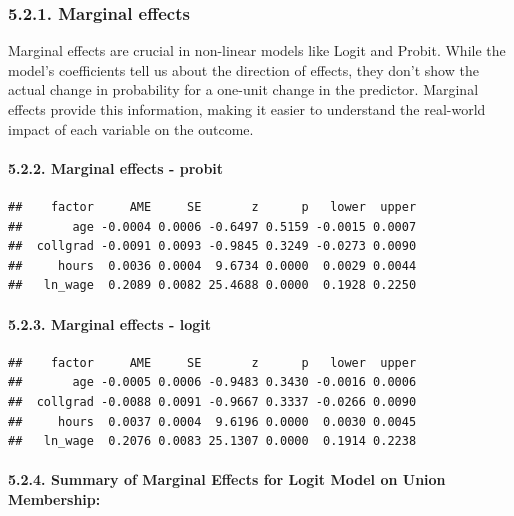 \documentclass[
]{article}
\begin{document}
\subsubsection{5.2.1. Marginal effects}\label{marginal-effects}

Marginal effects are crucial in non-linear models like Logit and Probit.
While the model's coefficients tell us about the direction of effects,
they don't show the actual change in probability for a one-unit change
in the predictor. Marginal effects provide this information, making it
easier to understand the real-world impact of each variable on the
outcome.

\paragraph{5.2.2. Marginal effects -
probit}\label{marginal-effects---probit}

\begin{verbatim}
##    factor     AME     SE       z      p   lower  upper
##       age -0.0004 0.0006 -0.6497 0.5159 -0.0015 0.0007
##  collgrad -0.0091 0.0093 -0.9845 0.3249 -0.0273 0.0090
##     hours  0.0036 0.0004  9.6734 0.0000  0.0029 0.0044
##   ln_wage  0.2089 0.0082 25.4688 0.0000  0.1928 0.2250
\end{verbatim}

\paragraph{5.2.3. Marginal effects -
logit}\label{marginal-effects---logit}

\begin{verbatim}
##    factor     AME     SE       z      p   lower  upper
##       age -0.0005 0.0006 -0.9483 0.3430 -0.0016 0.0006
##  collgrad -0.0088 0.0091 -0.9667 0.3337 -0.0266 0.0090
##     hours  0.0037 0.0004  9.6196 0.0000  0.0030 0.0045
##   ln_wage  0.2076 0.0083 25.1307 0.0000  0.1914 0.2238
\end{verbatim}

\paragraph{5.2.4. Summary of Marginal Effects for Logit Model on Union
Membership:}\label{summary-of-marginal-effects-for-logit-model-on-union-membership}
\end{document}
